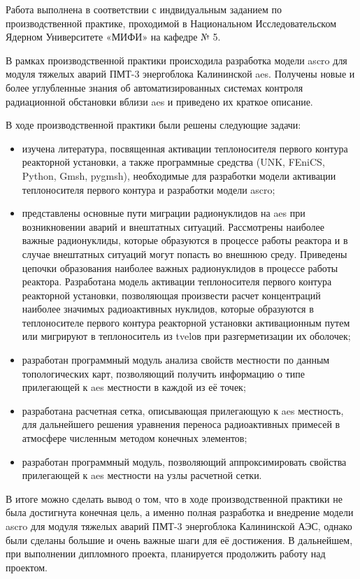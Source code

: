 
Работа выполнена в соответствии с индвидуальным заданием по производственной практике, проходимой в Национальном 
Исследовательском Ядерном Университете «МИФИ» на кафедре № 5.

В рамках производственной практики происходила разработка модели \ac{ascro} для модуля тяжелых аварий ПМТ-3 энергоблока 
Калининской \ac{aes}. Получены новые и более углубленные знания об автоматизированных системах контроля радиационной 
обстановки вблизи \ac{aes} и приведено их краткое описание.

В ходе производственной практики были решены следующие задачи:
\begin{itemize}
	\item изучена литература, посвященная активации теплоносителя первого контура реакторной установки, а также 
	программные средства (UNK, FEniCS, Python, Gmsh, pygmsh), необходимые для разработки модели активации теплоносителя 
	первого контура и разработки модели \ac{ascro};
	\item представлены основные пути миграции радионуклидов на \ac{aes} при возникновении аварий и внештатных ситуаций. 
	Рассмотрены наиболее важные радионуклиды, которые образуются в процессе работы реактора и в случае внештатных 
	ситуаций могут попасть во внешнюю среду. Приведены цепочки образования наиболее важных радионуклидов в процессе 
	работы реактора. Разработана модель активации теплоносителя первого контура реакторной установки, позволяющая 
	произвести расчет концентраций наиболее значимых радиоактивных нуклидов, которые образуются в теплоносителе первого 
	контура реакторной установки активационным путем или мигрируют в теплоноситель из \ac{tvel}ов при разгерметизации 
	их оболочек;
	\item разработан программный модуль анализа свойств местности по данным топологических карт, позволяющий получить 
	информацию о типе прилегающей к \ac{aes} местности в каждой из её точек;
	\item разработана расчетная сетка, описывающая прилегающую к \ac{aes} местность, для дальнейшего решения уравнения 
	переноса радиоактивных примесей в атмосфере численным методом конечных элементов;
	\item разработан программный модуль, позволяющий аппроксимировать свойства прилегающей к \ac{aes} местности на узлы 
	расчетной сетки. 
\end{itemize}

В итоге можно сделать вывод о том, что в ходе производственной практики не была достигнута конечная цель, а именно полная 
разработка и внедрение модели \ac{ascro} для модуля тяжелых аварий ПМТ-3 энергоблока Калининской АЭС, однако были 
сделаны большие и очень важные шаги для её достижения. В дальнейшем, при выполнении дипломного проекта, планируется 
продолжить работу над проектом.   